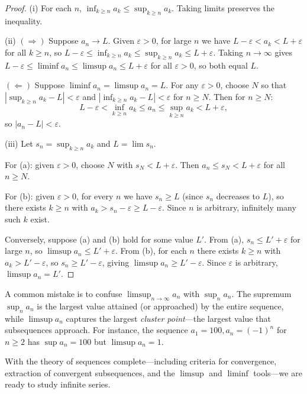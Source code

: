 \documentclass[11pt,a4paper]{article}
\begin{document}
\begin{proof}
(i) For each $n$, $\inf_{k \ge n} a_k \le \sup_{k \ge n} a_k$. Taking
limits preserves the inequality.

(ii) $(\Rightarrow)$ Suppose $a_n \to L$. Given $\varepsilon > 0$, for
large $n$ we have $L - \varepsilon < a_k < L + \varepsilon$ for all
$k \ge n$, so
$L - \varepsilon \le \inf_{k \ge n} a_k \le \sup_{k \ge n} a_k \le
L + \varepsilon$.
Taking $n \to \infty$ gives
$L - \varepsilon \le \liminf a_n \le \limsup a_n \le L + \varepsilon$
for all $\varepsilon > 0$, so both equal $L$.

$(\Leftarrow)$ Suppose $\liminf a_n = \limsup a_n = L$. For any
$\varepsilon > 0$, choose $N$ so that
$|\sup_{k \ge n} a_k - L| < \varepsilon$ and
$|\inf_{k \ge n} a_k - L| < \varepsilon$ for $n \ge N$. Then for
$n \ge N$:
\[
  L - \varepsilon < \inf_{k \ge n} a_k \le a_n
  \le \sup_{k \ge n} a_k < L + \varepsilon,
\]
so $|a_n - L| < \varepsilon$.

(iii) Let $s_n = \sup_{k \ge n} a_k$ and $L = \lim s_n$.

For (a): given $\varepsilon > 0$, choose $N$ with $s_N < L + \varepsilon$.
Then $a_n \le s_N < L + \varepsilon$ for all $n \ge N$.

For (b): given $\varepsilon > 0$, for every $n$ we have $s_n \ge L$
(since $s_n$ decreases to $L$), so there exists $k \ge n$ with
$a_k > s_n - \varepsilon \ge L - \varepsilon$. Since $n$ is arbitrary,
infinitely many such $k$ exist.

Conversely, suppose (a) and (b) hold for some value $L'$. From (a),
$s_n \le L' + \varepsilon$ for large $n$, so
$\limsup a_n \le L' + \varepsilon$. From (b), for each $n$ there exists
$k \ge n$ with $a_k > L' - \varepsilon$, so
$s_n \ge L' - \varepsilon$, giving
$\limsup a_n \ge L' - \varepsilon$. Since $\varepsilon$ is arbitrary,
$\limsup a_n = L'$.
\end{proof}

\begin{warning}[title={$\limsup$ is not $\sup$}]
A common mistake is to confuse $\limsup_{n\to\infty} a_n$ with
$\sup_n a_n$. The supremum $\sup_n a_n$ is the largest value attained
(or approached) by the entire sequence, while $\limsup a_n$ captures
the largest \emph{cluster point}---the largest value that subsequences
approach. For instance, the sequence $a_1 = 100, a_n = (-1)^n$ for
$n \ge 2$ has $\sup a_n = 100$ but $\limsup a_n = 1$.
\end{warning}

With the theory of sequences complete---including criteria for
convergence, extraction of convergent subsequences, and the $\limsup$ and
$\liminf$ tools---we are ready to study infinite series.
\end{document}
